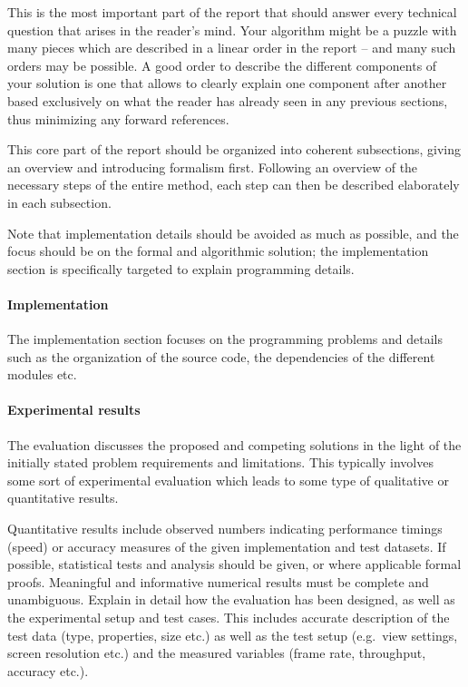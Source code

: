 \documentclass[11pt, a4paper,oneside,chapterprefix=false]{scrbook}
\begin{document}
This is the most important part of the report that should answer every technical question that arises in the reader's mind. Your algorithm might be a puzzle with many pieces which are described in a linear order in the report -- and many such orders may be possible. A good order to describe the different components of your solution is one that allows to clearly explain one component after another based exclusively on what the reader has already seen in any previous sections, thus minimizing any forward references.

This core part of the report should be organized into coherent subsections, giving an overview and introducing formalism first. Following an overview of the necessary steps of the entire method, each step can then be described elaborately in each subsection.

Note that implementation details should be avoided as much as possible, and the focus should be on the formal and algorithmic solution; the implementation section is specifically targeted to explain programming details.

\paragraph{Implementation}

The implementation section focuses on the programming problems and details such as the organization of the source code, the dependencies of the different modules etc.

\paragraph{Experimental results}

The evaluation discusses the proposed and competing solutions in the light of the initially stated problem requirements and limitations. This typically involves some sort of experimental evaluation which leads to some type of qualitative or quantitative results.

Quantitative results include observed numbers indicating performance timings (speed) or accuracy measures of the given implementation and test datasets. If possible, statistical tests and analysis should be given, or where applicable formal proofs. Meaningful and informative numerical results must be complete and unambiguous. Explain in detail how the evaluation has been designed, as well as the experimental setup and test cases. This includes accurate description of the test data (type, properties, size etc.) as well as the test setup (e.g.\ view settings, screen resolution etc.) and the measured variables (frame rate, throughput, accuracy etc.).
\end{document}

